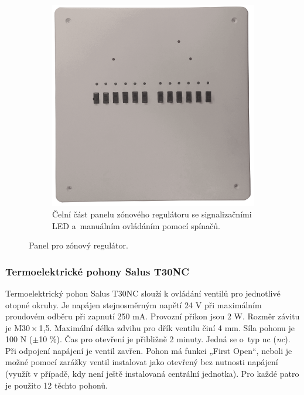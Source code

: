 \begin{figure}[H]
\begin{subfigure}{.5\textwidth}
  \includegraphics[width=\textwidth]{images/zonovy-regulator/zonovy-regulator-vrchni-strana.png}
  \caption[Čelní část panelu zónového regulátoru.]{Čelní část panelu zónového regulátoru se signalizačními LED a~manuálním ovládáním pomocí spínačů.}
    \label{fig:zonovy-regulator-vrchni-strana}
\end{subfigure}
\caption{Panel pro zónový regulátor.}
\label{fig:zonovy-regulator}
\end{figure}

\subsubsection{Termoelektrické pohony Salus T30NC}  
Termoelektrický pohon Salus T30NC \cite{termoelektricky-pohon-t30nc} slouží k ovládání ventilů pro jednotlivé otopné okruhy. Je napájen stejnosměrným napětí 24 V při maximálním proudovém odběru při zapnutí 250 mA. Provozní příkon jsou 2 W. Rozměr závitu je M30\,×\,1,5. Maximální délka zdvihu pro dřík ventilu činí 4 mm. Síla pohonu je 100 N ($\pm$10 \%). Čas pro otevření je přibližně 2 minuty. Jedná se o~typ \acrshort{nc} (\textit{\acrlong{nc}}). Při odpojení napájení je ventil zavřen. Pohon má funkci „First Open“, neboli je možné pomocí zarážky ventil instalovat jako otevřený bez nutnosti napájení (využít v případě, kdy není ještě instalovaná centrální jednotka). Pro každé patro je použito 12 těchto pohonů.


